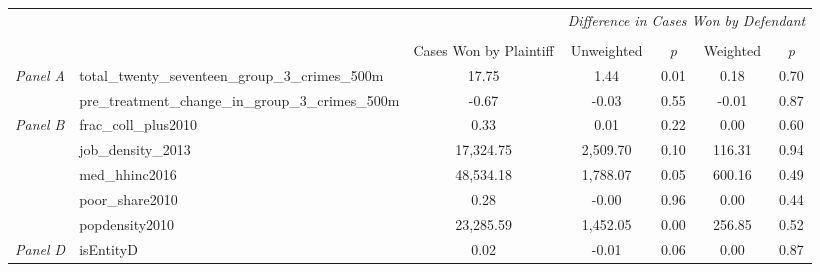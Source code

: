 \begin{tabular}{llccccc}
\toprule
 &  & \textit{} & \multicolumn{4}{c}{\textit{Difference in Cases Won by Defendant}} \\
\cline{4-7}
\\
 &  & Cases Won by Plaintiff & Unweighted & \emph{p} & Weighted & \emph{p} \\
\midrule
\multirow[c]{2}{3cm}{\textit{Panel A}} & total_twenty_seventeen_group_3_crimes_500m & 17.75 & 1.44 & 0.01 & 0.18 & 0.70 \\
 & pre_treatment_change_in_group_3_crimes_500m & -0.67 & -0.03 & 0.55 & -0.01 & 0.87 \\
\cline{1-7}
\multirow[c]{5}{3cm}{\textit{Panel B}} & frac_coll_plus2010 & 0.33 & 0.01 & 0.22 & 0.00 & 0.60 \\
 & job_density_2013 & 17,324.75 & 2,509.70 & 0.10 & 116.31 & 0.94 \\
 & med_hhinc2016 & 48,534.18 & 1,788.07 & 0.05 & 600.16 & 0.49 \\
 & poor_share2010 & 0.28 & -0.00 & 0.96 & 0.00 & 0.44 \\
 & popdensity2010 & 23,285.59 & 1,452.05 & 0.00 & 256.85 & 0.52 \\
\cline{1-7}
\textit{Panel D} & isEntityD & 0.02 & -0.01 & 0.06 & 0.00 & 0.87 \\
\cline{1-7}
\bottomrule
\end{tabular}
